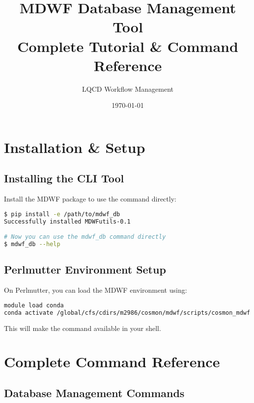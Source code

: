 \documentclass{article}
\title{MDWF Database Management Tool\\Complete Tutorial \& Command Reference}
\author{LQCD Workflow Management}
\date{\today}
\newcommand{\code}[1]{\texttt{\detokenize{#1}}}
\begin{document}
\maketitle

\tableofcontents
\newpage

\section{Installation \& Setup}

\subsection{Installing the CLI Tool}

Install the MDWF package to use the \code{mdwf_db} command directly:

\begin{lstlisting}[language=bash, caption=Installing MDWF CLI]
$ pip install -e /path/to/mdwf_db
Successfully installed MDWFutils-0.1

# Now you can use the mdwf_db command directly
$ mdwf_db --help
\end{lstlisting}

\subsection{Perlmutter Environment Setup}

On Perlmutter, you can load the MDWF environment using:

\begin{lstlisting}[language=bash]
module load conda
conda activate /global/cfs/cdirs/m2986/cosmon/mdwf/scripts/cosmon_mdwf
\end{lstlisting}

This will make the \code{mdwf_db} command available in your shell.

\section{Complete Command Reference}

\subsection{Database Management Commands}
\end{document}
